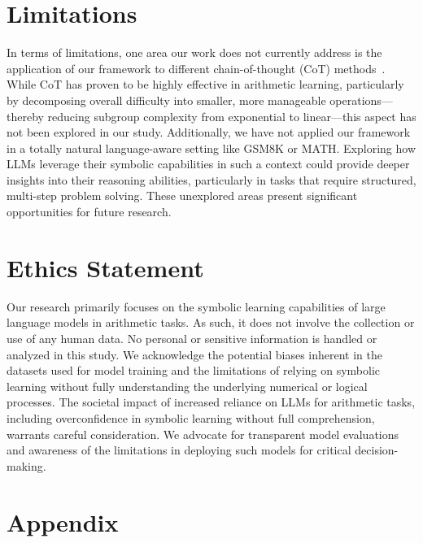 \documentclass[11pt]{article}
\begin{document}
\section{Limitations}
In terms of limitations, one area our work does not currently address is the application of our framework to different chain-of-thought (CoT) methods~\citep{wei2023chainofthoughtpromptingelicitsreasoning,deng2024explicitcotimplicitcot}. While CoT has proven to be highly effective in arithmetic learning, particularly by decomposing overall difficulty into smaller, more manageable operations—thereby reducing subgroup complexity from exponential to linear—this aspect has not been explored in our study. Additionally, we have not applied our framework in a totally natural language-aware setting like GSM8K or MATH. Exploring how LLMs leverage their symbolic capabilities in such a context could provide deeper insights into their reasoning abilities, particularly in tasks that require structured, multi-step problem solving. These unexplored areas present significant opportunities for future research.
\section{Ethics Statement}
Our research primarily focuses on the symbolic learning capabilities of large language models in arithmetic tasks. As such, it does not involve the collection or use of any human data. No personal or sensitive information is handled or analyzed in this study. We acknowledge the potential biases inherent in the datasets used for model training and the limitations of relying on symbolic learning without fully understanding the underlying numerical or logical processes. The societal impact of increased reliance on LLMs for arithmetic tasks, including overconfidence in symbolic learning without full comprehension, warrants careful consideration. We advocate for transparent model evaluations and awareness of the limitations in deploying such models for critical decision-making.




\appendix

\section{Appendix}
\end{document}
